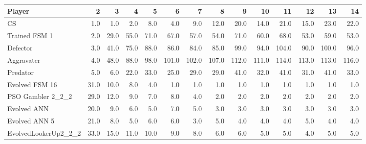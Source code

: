 \begin{tabular}{lrrrrrrrrrrrrr}
\toprule
               Player &     2 &     3 &     4 &     5 &      6 &      7 &      8 &      9 &     10 &     11 &     12 &     13 &     14 \\
\midrule
                   CS &   1.0 &   1.0 &   2.0 &   8.0 &    4.0 &    9.0 &   12.0 &   20.0 &   14.0 &   21.0 &   15.0 &   23.0 &   22.0 \\
        Trained FSM 1 &   2.0 &  29.0 &  55.0 &  71.0 &   67.0 &   57.0 &   54.0 &   71.0 &   60.0 &   68.0 &   53.0 &   59.0 &   53.0 \\
             Defector &   3.0 &  41.0 &  75.0 &  88.0 &   86.0 &   84.0 &   85.0 &   99.0 &   94.0 &  104.0 &   90.0 &  100.0 &   96.0 \\
           Aggravater &   4.0 &  48.0 &  88.0 &  98.0 &  101.0 &  102.0 &  107.0 &  112.0 &  111.0 &  114.0 &  113.0 &  113.0 &  116.0 \\
             Predator &   5.0 &   6.0 &  22.0 &  33.0 &   25.0 &   29.0 &   29.0 &   41.0 &   32.0 &   41.0 &   31.0 &   41.0 &   33.0 \\
       Evolved FSM 16 &  31.0 &  10.0 &   8.0 &   4.0 &    1.0 &    1.0 &    1.0 &    1.0 &    1.0 &    1.0 &    1.0 &    1.0 &    1.0 \\
    PSO Gambler 2\_2\_2 &  29.0 &  12.0 &   9.0 &   7.0 &    8.0 &    4.0 &    2.0 &    2.0 &    2.0 &    2.0 &    2.0 &    2.0 &    2.0 \\
          Evolved ANN &  20.0 &   9.0 &   6.0 &   5.0 &    7.0 &    5.0 &    3.0 &    3.0 &    3.0 &    3.0 &    3.0 &    3.0 &    3.0 \\
        Evolved ANN 5 &  21.0 &   8.0 &   5.0 &   6.0 &    6.0 &    3.0 &    5.0 &    4.0 &    4.0 &    4.0 &    5.0 &    4.0 &    4.0 \\
 EvolvedLookerUp2\_2\_2 &  33.0 &  15.0 &  11.0 &  10.0 &    9.0 &    8.0 &    6.0 &    6.0 &    5.0 &    5.0 &    4.0 &    5.0 &    5.0 \\
\bottomrule
\end{tabular}
